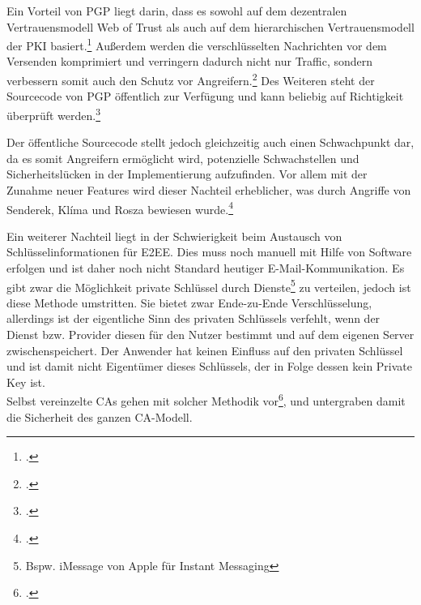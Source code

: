 \documentclass  [paper=a4,
				fontsize=12pt,
				listof=totoc,
				bibliography=totoc
				]{scrreprt}
\begin{document}

				
				
				
				Ein Vorteil von \ac{PGP} liegt darin, dass es sowohl auf dem dezentralen Vertrauensmodell Web of Trust als auch auf dem hierarchischen Vertrauensmodell der \ac{PKI} basiert.\footcite[vgl][S. 38f.]{Schwenk}
				Außerdem werden die verschlüsselten Nachrichten vor dem Versenden komprimiert und verringern dadurch nicht nur Traffic, sondern verbessern somit auch den Schutz vor Angreifern.\footcite[][S. 45]{Schwenk}	
				Des Weiteren steht der Sourcecode von \ac{PGP} öffentlich zur Verfügung und kann beliebig auf Richtigkeit überprüft werden.\footcite[][S. 47]{Schwenk}
				\medskip
									
				
			
			
				Der öffentliche Sourcecode stellt jedoch gleichzeitig auch einen Schwachpunkt dar, da es somit Angreifern ermöglicht wird, potenzielle Schwachstellen und Sicherheitslücken in der Implementierung aufzufinden. Vor allem mit der Zunahme neuer Features wird dieser Nachteil erheblicher, was durch Angriffe von Senderek, Klíma und Rosza bewiesen wurde.\footcite[vgl.][S. 47-55]{Schwenk}
				
				Ein weiterer Nachteil liegt in der Schwierigkeit beim Austausch von Schlüsselinformationen für \ac{E2EE}. Dies muss noch manuell mit Hilfe von Software erfolgen und ist daher noch nicht Standard heutiger E-Mail-Kommunikation. 
				Es gibt zwar die Möglichkeit private Schlüssel durch Dienste\footnote{Bspw. iMessage von Apple für Instant Messaging} zu verteilen, jedoch ist diese Methode umstritten. Sie bietet zwar Ende-zu-Ende Verschlüsselung, allerdings ist der eigentliche Sinn des privaten Schlüssels verfehlt, wenn der Dienst bzw. Provider diesen für den Nutzer bestimmt und auf dem eigenen Server zwischenspeichert. Der Anwender hat keinen Einfluss auf den privaten Schlüssel und ist damit nicht Eigentümer dieses Schlüssels, der in Folge dessen kein Private Key ist.\\
				Selbst vereinzelte \ac{CA}s gehen mit solcher Methodik vor\footcite{Kaps2014}, und untergraben damit die Sicherheit des ganzen \ac{CA}-Modell. \medskip\\
				
\end{document}
